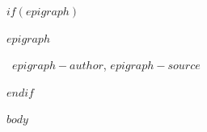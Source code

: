 \documentclass[letterpaper,twoside,openright]{tufte-book}
\newcommand{\openepigraph}[3]{ %
{\noindent\rmfamily\normalsize
{\itshape{#1}}
\begin{flushright}\noindent\faQuoteLeft ~{#2}, {\itshape{#3}} \end{flushright}}
}
\begin{document}
\endgroup
\clearpage

\begin{fullwidth}
\setcounter{tocdepth}{4}
\tableofcontents
\end{fullwidth}

\cleardoublepage

$if(epigraph)$
\vspace*{\fill}
\openepigraph{$epigraph$}{$epigraph-author$}{$epigraph-source$}
\vspace*{\fill}
$endif$


$body$

\clearpage
\end{document}
